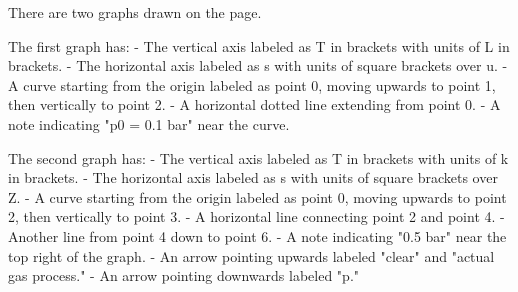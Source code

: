 There are two graphs drawn on the page.

The first graph has:
- The vertical axis labeled as T in brackets with units of L in brackets.
- The horizontal axis labeled as s with units of square brackets over u.
- A curve starting from the origin labeled as point 0, moving upwards to point 1, then vertically to point 2.
- A horizontal dotted line extending from point 0.
- A note indicating "p0 = 0.1 bar" near the curve.

The second graph has:
- The vertical axis labeled as T in brackets with units of k in brackets.
- The horizontal axis labeled as s with units of square brackets over Z.
- A curve starting from the origin labeled as point 0, moving upwards to point 2, then vertically to point 3.
- A horizontal line connecting point 2 and point 4.
- Another line from point 4 down to point 6.
- A note indicating "0.5 bar" near the top right of the graph.
- An arrow pointing upwards labeled "clear" and "actual gas process."
- An arrow pointing downwards labeled "p."